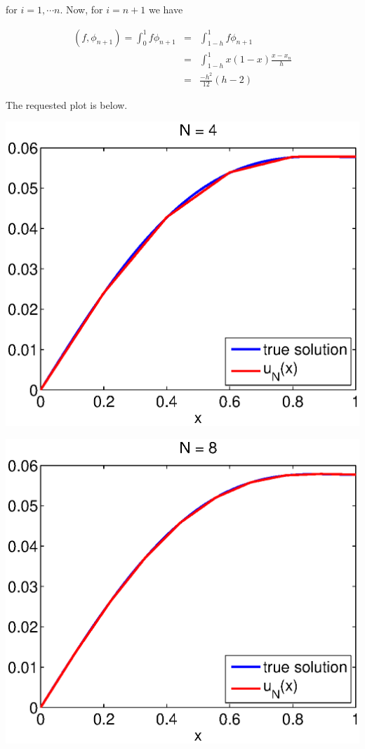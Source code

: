 {\begin{solution}
\begin{enumerate}
for $i= 1, \cdots n$. Now, for $i=n+1$ we have 


\begin{eqnarray*}
(f,\phi_{n+1})= \int_0^1 f \phi_{n+1} &=& \int_{1-h}^{1} f \phi_{n+1} \\
																		&=& \int_{1-h}^{1} x(1-x) \frac{x-x_{n}}{h}\\
																		&=& \frac{-h^2}{12}(h-2)																		
\end{eqnarray*}

The requested plot is below.

\begin{center}\includegraphics[scale=0.7]{hw92c.eps}\end{center}
\begin{center}\includegraphics[scale=0.7]{hw92c8.eps}\end{center}


\end{enumerate}
\end{solution}}
